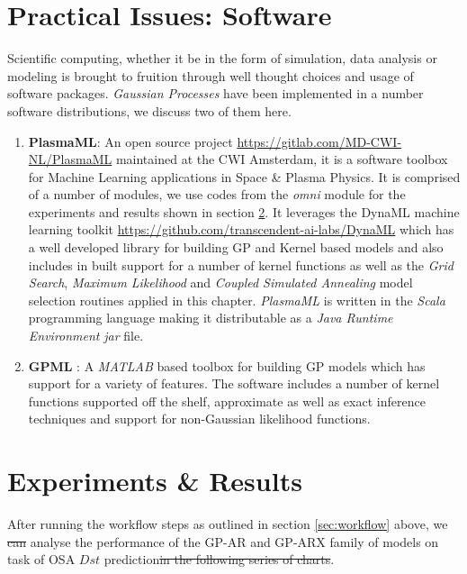 \documentclass{article}
\providecommand{\DIFadd}[1]{{\protect\color{blue}\uwave{#1}}} %
\providecommand{\DIFdel}[1]{{\protect\color{red}\sout{#1}}}                      %
\providecommand{\DIFaddbegin}{} %
\providecommand{\DIFaddend}{} %
\providecommand{\DIFdelbegin}{} %
\providecommand{\DIFdelend}{} %
\newcommand{\DIFscaledelfig}{0.5}
\newlength{\DIFdelgraphicswidth} %
\newlength{\DIFdelgraphicsheight} %
\newcommand{\DIFaddincludegraphics}[2][]{{\color{blue}\fbox{\DIFOincludegraphics[#1]{#2}}}} %
\newcommand{\DIFdelincludegraphics}[2][]{%
\sbox{\DIFdelgraphicsbox}{\DIFOincludegraphics[#1]{#2}}%
\settoboxwidth{\DIFdelgraphicswidth}{\DIFdelgraphicsbox} %
\settoboxtotalheight{\DIFdelgraphicsheight}{\DIFdelgraphicsbox} %
\scalebox{\DIFscaledelfig}{%
\parbox[b]{\DIFdelgraphicswidth}{\usebox{\DIFdelgraphicsbox}\\[-\baselineskip] \rule{\DIFdelgraphicswidth}{0em}}\llap{\resizebox{\DIFdelgraphicswidth}{\DIFdelgraphicsheight}{%
\setlength{\unitlength}{\DIFdelgraphicswidth}%
\begin{picture}(1,1)%
\thicklines\linethickness{2pt} %
{\color[rgb]{1,0,0}\put(0,0){\framebox(1,1){}}}%
{\color[rgb]{1,0,0}\put(0,0){\line( 1,1){1}}}%
{\color[rgb]{1,0,0}\put(0,1){\line(1,-1){1}}}%
\end{picture}%
}\hspace*{3pt}}} %
} %
\DeclareRobustCommand{\DIFaddbegin}{\DIFOaddbegin \let\includegraphics\DIFaddincludegraphics} %
\DeclareRobustCommand{\DIFaddend}{\DIFOaddend \let\includegraphics\DIFOincludegraphics} %
\DeclareRobustCommand{\DIFdelbegin}{\DIFOdelbegin \let\includegraphics\DIFdelincludegraphics} %
\DeclareRobustCommand{\DIFdelend}{\DIFOaddend \let\includegraphics\DIFOincludegraphics} %
\begin{document}
\section{Practical Issues: Software}

Scientific computing, whether it be in the form of simulation, data
analysis or modeling is brought to fruition through well thought
choices and usage of software packages. \emph{Gaussian Processes} have
been implemented in a number software distributions, we discuss two of
them here.

\begin{enumerate}

\item \textbf{PlasmaML}: An open source project
  \url{https://gitlab.com/MD-CWI-NL/PlasmaML} maintained at the CWI
  Amsterdam, it is a software toolbox for Machine Learning
  applications in Space \& Plasma Physics. It is comprised of a number
  of modules, we use codes from the \textit{omni} module for the
  experiments and results shown in section \ref{sec:results}. It
  leverages the DynaML machine learning toolkit
  \url{https://github.com/transcendent-ai-labs/DynaML} which has a
  well developed library for building GP and Kernel based models and
  also includes in built support for a number of kernel functions as
  well as the \emph{Grid Search}, \emph{Maximum Likelihood} and
  \emph{Coupled Simulated Annealing} model selection routines applied
  in this chapter. \textit{PlasmaML} is written in the \textit{Scala}
  programming language making it distributable as a \emph{Java Runtime
    Environment} \textit{jar} file.

\item \textbf{GPML} \citep{GPML}: A \emph{MATLAB} based toolbox for
  building GP models which has support for a variety of features. The
  software includes a number of kernel functions supported off the
  shelf, approximate as well as exact inference techniques and support
  for non-Gaussian likelihood functions. 
\end{enumerate}

\section{Experiments \& Results}\label{sec:results}

After running the workflow steps as outlined in section
\ref{sec:workflow} above, we \DIFdelbegin \DIFdel{can }\DIFdelend \DIFaddbegin \DIFadd{are at a position to }\DIFaddend analyse the
performance of the GP-AR and GP-ARX family of models on task of OSA
$Dst$ prediction\DIFdelbegin \DIFdel{in the following series of charts}\DIFdelend .
\end{document}
